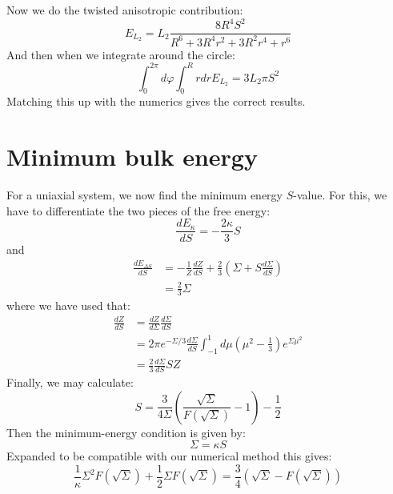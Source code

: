 \documentclass[reqno]{article}
\newcommand{\F}{F \left( \sqrt{\Sigma} \right)}
\newcommand{\sSigma}{\sqrt{\Sigma}}
\begin{document}
Now we do the twisted anisotropic contribution:
\begin{equation}
    E_{L_2}
    =
    L_2 \frac{8 R^{4} S^{2}}{R^{6} + 3 R^{4} r^{2} + 3 R^{2} r^{4} + r^{6}}
\end{equation}
And then when we integrate around the circle:
\begin{equation}
    \int_0^{2\pi} d\varphi \int_0^R r dr E_{L_2}
    =
    3 L_2 \pi S^2
\end{equation}
Matching this up with the numerics gives the correct results.

\section{Minimum bulk energy}

For a uniaxial system, we now find the minimum energy $S$-value.
For this, we have to differentiate the two pieces of the free energy:
\begin{equation}
    \frac{d E_\kappa}{d S}
    =
    -\frac{2 \kappa}{3} S
\end{equation}
and
\begin{equation}
\begin{split}
    \frac{d E_{\Delta S}}{d S}
    &=
    -\frac{1}{Z} \frac{d Z}{d S}
    + \frac23 \left( \Sigma + S \frac{d \Sigma}{d S} \right) \\
    &=
    \frac23 \Sigma
\end{split}
\end{equation}
where we have used that:
\begin{equation}
\begin{split}
    \frac{d Z}{d S}
    &=
    \frac{d Z}{d \Sigma} \frac{d \Sigma}{d S} \\
    &=
    2 \pi e^{-\Sigma / 3} \frac{d \Sigma}{d S} \int_{-1}^1 d\mu \left( \mu^2 - \tfrac13 \right) e^{\Sigma \mu^2}\\
    &=
    \frac23 \frac{d \Sigma}{dS} S Z
\end{split}
\end{equation}
Finally, we may calculate:
\begin{equation}
    S
    =
    \frac{3}{4 \Sigma} \left( \frac{\sqrt{\Sigma}}{F\left(\sqrt{\Sigma}\right)} - 1 \right) - \frac12
\end{equation}
Then the minimum-energy condition is given by:
\begin{equation}
    \Sigma
    =
    \kappa S
\end{equation}
Expanded to be compatible with our numerical method this gives:
\begin{equation}
    \frac{1}{\kappa} \Sigma^2 \F + \frac12 \Sigma \F
    =
    \frac34 \left( \sSigma - \F \right)
\end{equation}
\end{document}
